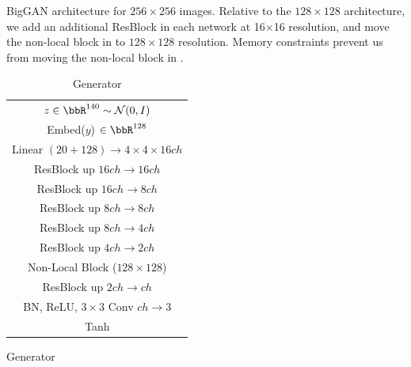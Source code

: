 \begin{table}[ht]
         \caption{\label{tab:resnets_imagenet256} BigGAN architecture for $256\times 256$ images. 
         Relative to the $128\times 128$ architecture, we add an additional ResBlock in each network at 16$\times$16 resolution, and move the non-local block in \gen{} to $128\times 128$ resolution. Memory constraints prevent us from moving the non-local block in \discr{}.}
          \centering
          \small
          \begin{subtable}{.4\textwidth}
              \centering
              {\begin{tabular}{c}
                  \toprule
                  \midrule
                  $z\in \bbR^{140} \sim \mathcal{N}(0, I)$ \\
                  Embed($y$) $\in \bbR^{128}$ \\
                  \midrule
                  Linear $(20+128) \rightarrow 4 \times 4 \times 16 ch $ \\
                  \midrule
                  ResBlock up $16ch \rightarrow 16ch$ \\
                  \midrule
                  ResBlock up $16ch \rightarrow 8ch$\\
                  \midrule
                  ResBlock up $8ch \rightarrow 8ch$\\
                  \midrule
                  ResBlock up $8ch \rightarrow 4ch$\\
                  \midrule
                  ResBlock up $4ch \rightarrow 2ch$\\
                  \midrule
                  Non-Local Block ($128\times 128$) \\
                  \midrule
                  ResBlock up $2ch \rightarrow ch$\\
                  \midrule
                  BN, ReLU, $3\times 3$ Conv $ch\rightarrow 3$ \\
                  \midrule
                  Tanh\\
                  \midrule
                  \bottomrule
              \end{tabular}}
              \caption{\label{tab:gen_resnet_imagenet_256} Generator}
          \end{subtable}
          \begin{subtable}{.4\textwidth}
              \centering
              {\begin{tabular}{c}
                  \toprule
                  \midrule

\end{tabular}}
\end{subtable}
\end{table}
